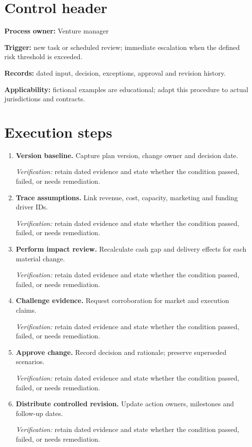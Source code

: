 \documentclass[11pt]{article}
\begin{document}
\SuiteOpen
\section{Control header}
\textbf{Process owner:} Venture manager\par\textbf{Trigger:} new task or scheduled review; immediate escalation when the defined risk threshold is exceeded.\par\textbf{Records:} dated input, decision, exceptions, approval and revision history.\par\textbf{Applicability:} fictional examples are educational; adapt this procedure to actual jurisdictions and contracts.
\section{Execution steps}
\begin{enumerate}[leftmargin=*,itemsep=8pt]
\item \textbf{Version baseline.} Capture plan version, change owner and decision date.\par\textit{Verification:} retain dated evidence and state whether the condition passed, failed, or needs remediation.
\item \textbf{Trace assumptions.} Link revenue, cost, capacity, marketing and funding driver IDs.\par\textit{Verification:} retain dated evidence and state whether the condition passed, failed, or needs remediation.
\item \textbf{Perform impact review.} Recalculate cash gap and delivery effects for each material change.\par\textit{Verification:} retain dated evidence and state whether the condition passed, failed, or needs remediation.
\item \textbf{Challenge evidence.} Request corroboration for market and execution claims.\par\textit{Verification:} retain dated evidence and state whether the condition passed, failed, or needs remediation.
\item \textbf{Approve change.} Record decision and rationale; preserve superseded scenarios.\par\textit{Verification:} retain dated evidence and state whether the condition passed, failed, or needs remediation.
\item \textbf{Distribute controlled revision.} Update action owners, milestones and follow-up dates.\par\textit{Verification:} retain dated evidence and state whether the condition passed, failed, or needs remediation.
\end{enumerate}
\end{document}
